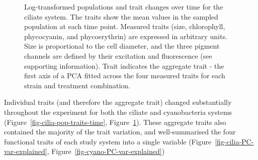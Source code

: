 \documentclass[
  letterpaper,
  DIV=11,
  numbers=noendperiod]{scrartcl}
\begin{document}
\begin{figure}


\caption{\label{fig-cyano-pop-traits-time}Log-transformed populations
and trait changes over time for the ciliate system. The traits show the
mean values in the sampled population at each time point. Measured
traits (size, chlorophyll, phycocyanin, and phycoerythrin) are expressed
in arbitrary units. Size is proportional to the cell diameter, and the
three pigment channels are defined by their excitation and fluorescence
(see supporting information). Trait indicates the aggregate trait - the
first axis of a PCA fitted across the four measured traits for each
strain and treatment combination.}

\end{figure}%

Individual traits (and therefore the aggregate trait) changed
substantially throughout the experiment for both the ciliate and
cyanobacteria systems (Figure~\ref{fig-cilia-pop-traits-time},
Figure~\ref{fig-cyano-pop-traits-time}). These aggregate traits also
contained the majority of the trait variation, and well-summarised the
four functional traits of each study system into a single variable
(Figure~\ref{fig-cilia-PC-var-explained},
Figure~\ref{fig-cyano-PC-var-explained})
\end{document}
